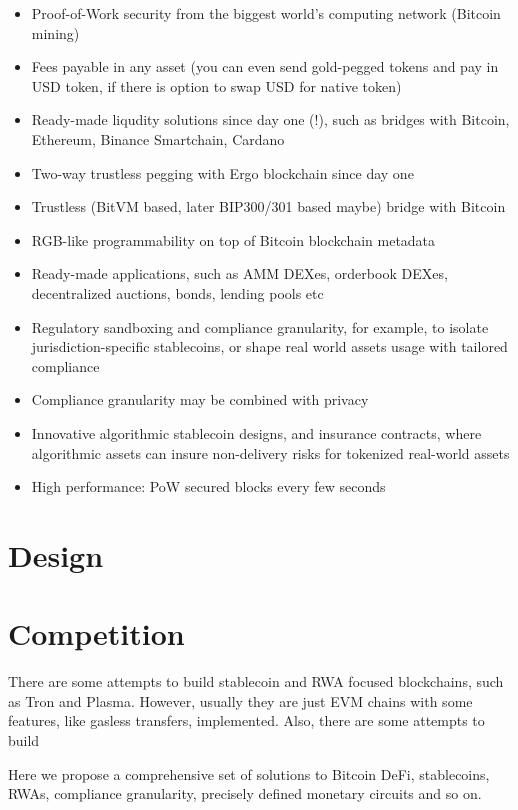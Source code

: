 \documentclass{llncs}   %
\begin{document}
\begin{itemize}
  \item Proof-of-Work security from the biggest world's computing network (Bitcoin mining)
  \item Fees payable in any asset (you can even send gold-pegged tokens and pay in USD token, if there is option to swap USD for native token)
  \item Ready-made liqudity solutions since day one (!), such as bridges with Bitcoin, Ethereum, Binance Smartchain, Cardano
  \item Two-way trustless pegging with Ergo blockchain since day one
  \item Trustless (BitVM based, later BIP300/301 based maybe) bridge with Bitcoin
  \item RGB-like programmability on top of Bitcoin blockchain metadata
  \item Ready-made applications, such as AMM DEXes, orderbook DEXes, decentralized auctions, bonds, lending pools etc
  \item Regulatory sandboxing and compliance granularity, for example, to isolate jurisdiction-specific stablecoins, or shape real world assets usage with tailored compliance
  \item Compliance granularity may be combined with privacy
  \item Innovative algorithmic stablecoin designs, and insurance contracts, where algorithmic assets can insure non-delivery risks for tokenized real-world assets
  \item High performance: PoW secured blocks every few seconds
\end{itemize}



\section{Design}
\label{sec-design}




\section{Competition}
\label{sec-competition}


There are some attempts to build stablecoin and RWA focused blockchains, such as Tron and Plasma. However, usually they are just EVM chains with some features, like gasless transfers, implemented. Also, there are some attempts to build 

Here we propose a comprehensive set of solutions to Bitcoin DeFi, stablecoins, RWAs,
compliance granularity, precisely defined monetary circuits and so on.  
\end{document}

